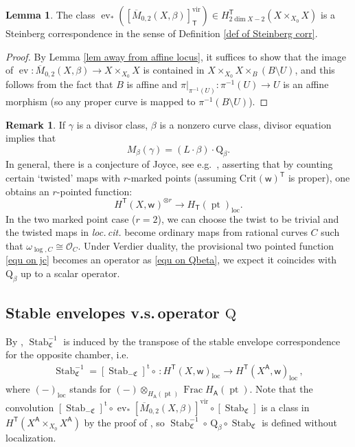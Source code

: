 \documentclass[10pt]{amsart}
\theoremstyle{definition}
\newtheorem{Lemma}[Theorem]{Lemma}
\newtheorem{Remark}[Theorem]{Remark}
\numberwithin{equation}{section}
\newcommand{\sQ}{\mathrm{Q}}
\newcommand{\oO}{\mathcal{O}}
\newcommand{\Crit}{\mathrm{Crit}}
\newcommand{\fC}{\mathfrak{C}}
\newcommand{\loc}{\mathrm{loc}}
\newcommand{\vir}{\mathrm{vir}}
\newcommand{\sA}{\mathsf{A}}
\newcommand{\sT}{\mathsf{T}}
\newcommand{\sw}{\mathsf{w}}
\newcommand{\ev}{\operatorname{ev}}
\newcommand{\Frac}{\operatorname{Frac}}
\newcommand{\pt}{\operatorname{pt}}
\newcommand{\Stab}{\operatorname{Stab}}
\begin{document}
\begin{Lemma}\label{lem 2-pt Steinberg}
The class $\ev_*([\overline{M}_{0,2}(X,\beta)]_{\sT}^{\vir})\in H^\sT_{2\dim X-2}(X\times_{X_0}X)$ is a Steinberg correspondence in the sense of Definition \ref{def of Steinberg corr}.
\end{Lemma}

\begin{proof}
By Lemma \ref{lem away from affine locus}, it suffices to show that the image of $\ev\colon \overline{M}_{0,2}(X,\beta)\to X\times_{X_0} X$ is contained in $X\times_{X_0} X\times_B (B\setminus U)$, and this follows from the fact that $B$ is affine and $\pi|_{\pi^{-1}(U)}\colon \pi^{-1}(U)\to U$ is an affine morphism (so any proper curve is mapped to $\pi^{-1}(B\setminus U)$).
\end{proof}

\begin{Remark}\label{rmk on two qbet}
If $\gamma$ is a divisor class, $\beta$ is a nonzero curve class, divisor equation implies that 
$$M_{\beta}(\gamma)=(L\cdot \beta)\cdot \sQ_{\beta}. $$ 
In general, there is a conjecture of Joyce, see e.g.~\cite{Joy, CZ, CTZ}, asserting that by counting certain `twisted' maps with $r$-marked points (assuming $\Crit(\sw)^\sT$ is proper), one obtains an 
$r$-pointed function:
\begin{equation}\label{equ on jc}H^{\sT}(X,\sw_{})^{\otimes r} \to H_\sT(\pt)_{\loc}. \end{equation}
In the two marked point case ($r=2$), we can choose the twist to be trivial and 
the twisted maps in \textit{loc.\,cit.} become ordinary maps from rational curves $C$ such that $\omega_{\log,C}\cong \oO_C$.
Under Verdier duality, 
the provisional two pointed function \eqref{equ on jc} becomes an operator as \eqref{equ on Qbeta}, we expect it coincides with $\sQ_{\beta}$ up to a scalar operator. 
\end{Remark}


\subsection{Stable envelopes v.s.\,operator $\sQ$}
By \cite[Lem.~3.29]{COZZ}, $\Stab_\fC^{-1}$ is induced by the transpose of the stable envelope correspondence for the opposite chamber, i.e. 
\begin{align*}
\Stab_\fC^{-1}=[\Stab_{-\fC}]^{\mathrm{t}}\circ \,\colon H^{\sT}(X,\sw)_\loc\to H^{\sT}(X^\sA,\sw)_\loc\,,
\end{align*}
where $(-)_\loc$ stands for $(-)\otimes_{H_\sA(\pt)}\Frac H_\sA(\pt)$. Note that the convolution $[\Stab_{-\fC}]^{\mathrm{t}}\circ\ev_*[\overline{M}_{0,2}(X,\beta)]^{\vir}\circ[\Stab_\fC]$ is a class in $H^{\sT}(X^\sA\times_{X_0}X^\sA)$ by the proof of \cite[Lem.~3.29]{COZZ}, so $\Stab_\fC^{-1}\circ\, \sQ_\beta\circ \Stab_\fC$ is defined without localization.
\end{document}
